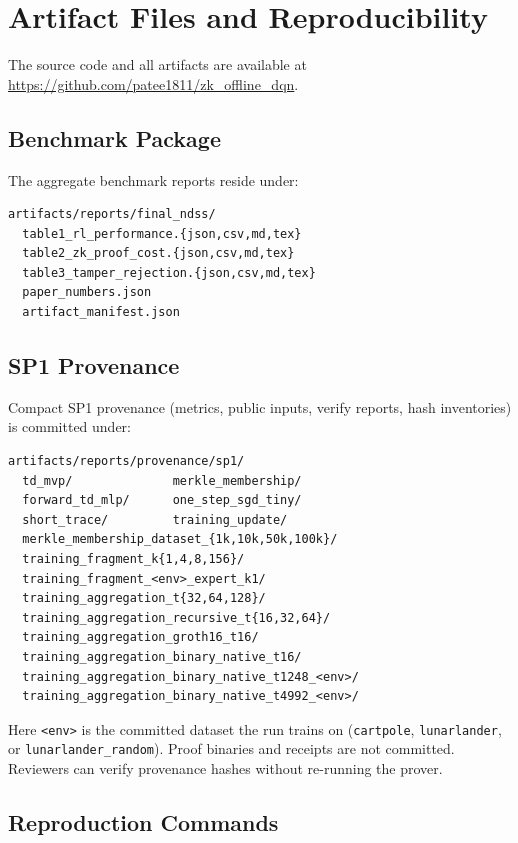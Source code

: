 \appendices

\section{Artifact Files and Reproducibility}
\label{app:artifact-files}

The source code and all artifacts are available at
\url{https://github.com/patee1811/zk_offline_dqn}.

\subsection{Benchmark Package}

The aggregate benchmark reports reside under:
{\scriptsize
\begin{verbatim}
artifacts/reports/final_ndss/
  table1_rl_performance.{json,csv,md,tex}
  table2_zk_proof_cost.{json,csv,md,tex}
  table3_tamper_rejection.{json,csv,md,tex}
  paper_numbers.json
  artifact_manifest.json
\end{verbatim}
}

\subsection{SP1 Provenance}

Compact SP1 provenance (metrics, public inputs, verify reports, hash
inventories) is committed under:
{\scriptsize
\begin{verbatim}
artifacts/reports/provenance/sp1/
  td_mvp/              merkle_membership/
  forward_td_mlp/      one_step_sgd_tiny/
  short_trace/         training_update/
  merkle_membership_dataset_{1k,10k,50k,100k}/
  training_fragment_k{1,4,8,156}/
  training_fragment_<env>_expert_k1/
  training_aggregation_t{32,64,128}/
  training_aggregation_recursive_t{16,32,64}/
  training_aggregation_groth16_t16/
  training_aggregation_binary_native_t16/
  training_aggregation_binary_native_t1248_<env>/
  training_aggregation_binary_native_t4992_<env>/
\end{verbatim}
}
\noindent Here \texttt{<env>} is the committed dataset the run trains on
(\texttt{cartpole}, \texttt{lunarlander}, or \texttt{lunarlander\_random}).
Proof binaries and receipts are not committed. Reviewers can verify provenance
hashes without re-running the prover.

\subsection{Reproduction Commands}
\label{app:reproducibility}

